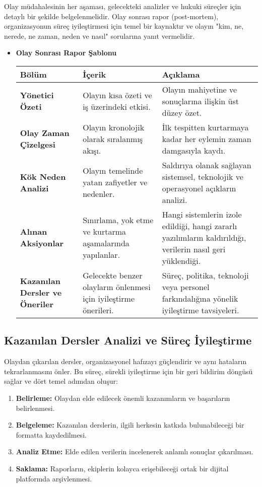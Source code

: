 Olay müdahalesinin her aşaması, gelecekteki analizler ve hukuki süreçler için detaylı bir şekilde belgelenmelidir. Olay sonrası rapor (post-mortem), organizasyonun süreç iyileştirmesi için temel bir kaynaktır ve olayın "kim, ne, nerede, ne zaman, neden ve nasıl" sorularına yanıt vermelidir.

\begin{itemize}
    \item \textbf{Olay Sonrası Rapor Şablonu}
    \begin{tabular}{|l|l|l|}
    \hline
    \textbf{Bölüm} & \textbf{İçerik} & \textbf{Açıklama} \\
    \hline
    \textbf{Yönetici Özeti} & Olayın kısa özeti ve iş üzerindeki etkisi. & Olayın mahiyetine ve sonuçlarına ilişkin üst düzey özet. \\
    \hline
    \textbf{Olay Zaman Çizelgesi} & Olayın kronolojik olarak sıralanmış akışı. & İlk tespitten kurtarmaya kadar her eylemin zaman damgasıyla kaydı. \\
    \hline
    \textbf{Kök Neden Analizi} & Olayın temelinde yatan zafiyetler ve nedenler. & Saldırıya olanak sağlayan sistemsel, teknolojik ve operasyonel açıkların analizi. \\
    \hline
    \textbf{Alınan Aksiyonlar} & Sınırlama, yok etme ve kurtarma aşamalarında yapılanlar. & Hangi sistemlerin izole edildiği, hangi zararlı yazılımların kaldırıldığı, verilerin nasıl geri yüklendiği. \\
    \hline
    \textbf{Kazanılan Dersler ve Öneriler} & Gelecekte benzer olayların önlenmesi için iyileştirme önerileri. & Süreç, politika, teknoloji veya personel farkındalığına yönelik iyileştirme tavsiyeleri. \\
    \hline
    \end{tabular}
\end{itemize}

\subsection{Kazanılan Dersler Analizi ve Süreç İyileştirme}

Olaydan çıkarılan dersler, organizasyonel hafızayı güçlendirir ve aynı hataların tekrarlanmasını önler. Bu süreç, sürekli iyileştirme için bir geri bildirim döngüsü sağlar ve dört temel adımdan oluşur:

\begin{enumerate}
    \item \textbf{Belirleme:} Olaydan elde edilecek önemli kazanımların ve başarıların belirlenmesi.
    \item \textbf{Belgeleme:} Kazanılan derslerin, ilgili herkesin katkıda bulunabileceği bir formatta kaydedilmesi.
    \item \textbf{Analiz Etme:} Elde edilen verilerin incelenerek anlamlı sonuçlar çıkarılması.
    \item \textbf{Saklama:} Raporların, ekiplerin kolayca erişebileceği ortak bir dijital platformda arşivlenmesi.
\end{enumerate}

